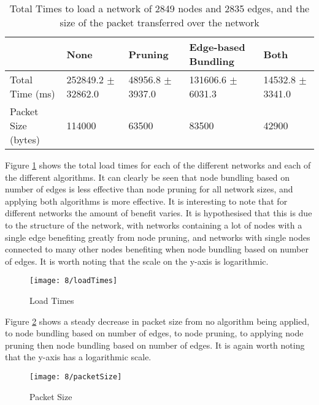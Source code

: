 \documentclass[../dissertation.tex]{subfiles}
\begin{document}
\begin{table}[H]
\centering
\setlength{\tabcolsep}{0.4em}
\begin{tabular}{|l|l|l|l|l|}
\hline
                    & \textbf{None}          & \textbf{Pruning}     & \textbf{Edge-based Bundling}         & \textbf{Both}        \\ \hline
Total Time (ms)     & 252849.2 $\pm$ 32862.0 & 48956.8 $\pm$ 3937.0 & 131606.6 $\pm$ 6031.3 & 14532.8 $\pm$ 3341.0 \\ \hline
Packet Size (bytes) & 114000                 & 63500                & 83500                 & 42900                \\ \hline
\end{tabular}
\caption{Total Times to load a network of 2849 nodes and 2835 edges, and the size of the packet transferred over the network}
\label{table:3000-nodes}
\end{table}

Figure \ref{fig:loadTimes} shows the total load times for each of the different networks and each of the different algorithms. It can clearly be seen that node bundling based on number of edges is less effective than node pruning for all network sizes, and applying both algorithms is more effective. It is interesting to note that for different networks the amount of benefit varies. It is hypothesised that this is due to the structure of the network, with networks containing a lot of nodes with a single edge benefiting greatly from node pruning, and networks with single nodes connected to many other nodes benefiting when node bundling based on number of edges. It is worth noting that the scale on the y-axis is logarithmic.

\begin{figure}[H]
    \centering
    \texttt{[image: 8/loadTimes]}
    \caption{Load Times}
    \label{fig:loadTimes}
\end{figure}

Figure \ref{fig:packetSize} shows a steady decrease in packet size from no algorithm being applied, to node bundling based on number of edges, to node pruning, to applying node pruning then node bundling based on number of edges. It is again worth noting that the y-axis has a logarithmic scale.

\begin{figure}[H]
    \centering
    \texttt{[image: 8/packetSize]}
    \caption{Packet Size}
    \label{fig:packetSize}
\end{figure}
\end{document}
